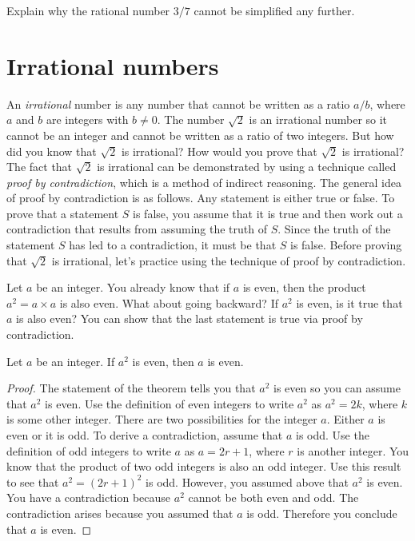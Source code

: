 \documentclass[a4paper,oneside,12pt]{article}
\begin{document}
\begin{exercise}
Explain why the rational number $3/7$ cannot be simplified any
further.
\end{exercise}




\section{Irrational numbers}

An \emph{irrational} number is any number that cannot be written as a
ratio $a / b$, where $a$ and $b$ are integers with $b \neq 0$.  The
number $\sqrt{2}$ is an irrational number so it cannot be an integer
and cannot be written as a ratio of two integers.  But how did you
know that $\sqrt{2}$ is irrational?  How would you prove that
$\sqrt{2}$ is irrational?  The fact that $\sqrt{2}$ is irrational can
be demonstrated by using a technique called
\emph{proof by contradiction}, which is a method of indirect
reasoning.  The general idea of proof by contradiction is as follows.
Any statement is either true or false.  To prove that a statement $S$
is false, you assume that it is true and then work out a contradiction
that results from assuming the truth of $S$.  Since the truth of the
statement $S$ has led to a contradiction, it must be that $S$ is
false.  Before proving that $\sqrt{2}$ is irrational, let's practice
using the technique of proof by contradiction.

Let $a$ be an integer.  You already know that if $a$ is even, then the
product $a^2 = a \times a$ is also even.  What about going backward?
If $a^2$ is even, is it true that $a$ is also even?  You can show that
the last statement is true via proof by contradiction.

\begin{theorem}
\label{thm:a_squared_even_implies_a_even}
Let $a$ be an integer.  If $a^2$ is even, then $a$ is even.
\end{theorem}

\begin{proof}
The statement of the theorem tells you that $a^2$ is even so you can
assume that $a^2$ is even.  Use the definition of even integers to
write $a^2$ as $a^2 = 2k$, where $k$ is some other integer.  There are
two possibilities for the integer $a$.  Either $a$ is even or it is
odd.  To derive a contradiction, assume that $a$ is odd.  Use the
definition of odd integers to write $a$ as $a = 2r + 1$, where $r$ is
another integer.  You know that the product of two odd integers is
also an odd integer.  Use this result to see that $a^2 = (2r + 1)^2$
is odd.  However, you assumed above that $a^2$ is even.  You have a
contradiction because $a^2$ cannot be both even and odd.  The
contradiction arises because you assumed that $a$ is odd.  Therefore
you conclude that $a$ is even.
\end{proof}
\end{document}
